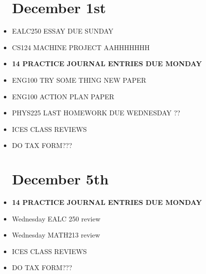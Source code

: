 \documentclass{report}
\newcommand{\done}{\textbf{\checkmark}}
\begin{document}
\begin{itemize}
\chapter{December 1st}
\item
EALC250 ESSAY DUE SUNDAY \done
\item
CS124 MACHINE PROJECT AAHHHHHHH \done
\item
\textbf{ 14 PRACTICE JOURNAL ENTRIES DUE MONDAY }
\item
ENG100 TRY SOME THING NEW PAPER \done
\item
ENG100 ACTION PLAN PAPER \done
\item
PHYS225 LAST HOMEWORK DUE WEDNESDAY \done ??
\item
ICES CLASS REVIEWS
\item
DO TAX FORM???


\chapter{December 5th}
\item
\textbf{ 14 PRACTICE JOURNAL ENTRIES DUE MONDAY } \done
\item
Wednesday EALC 250 review \done
\item
Wednesday MATH213 review \done
\item
ICES CLASS REVIEWS
\item
DO TAX FORM???


\end{itemize}
\end{document}
